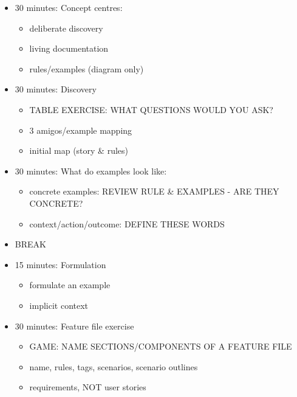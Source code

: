     \begin{itemize}
        \item 30 minutes: Concept centres:
        \begin{itemize}
            \item deliberate discovery
            \item living documentation
            \item rules/examples (diagram only)
        \end{itemize}
        
        \item 30 minutes: Discovery
        \begin{itemize}
            \item TABLE EXERCISE: WHAT QUESTIONS WOULD YOU ASK?
            \item 3 amigos/example mapping
            \item initial map (story \& rules)
        \end{itemize}
        
        \item 30 minutes: What do examples look like:
        \begin{itemize}
            \item concrete examples: REVIEW RULE \& EXAMPLES - ARE THEY CONCRETE?
            \item context/action/outcome: DEFINE THESE WORDS
        \end{itemize}
    
        \item BREAK
    
        \item 15 minutes: Formulation
    
        \begin{itemize}
            \item formulate an example
            \item implicit context
        \end{itemize}
        \item 30 minutes: Feature file exercise
    
        \begin{itemize}
            \item GAME: NAME SECTIONS/COMPONENTS OF A FEATURE FILE
            \item name, rules, tags, scenarios, scenario outlines
            \item requirements, NOT user stories
        \end{itemize}
    

\end{itemize}
